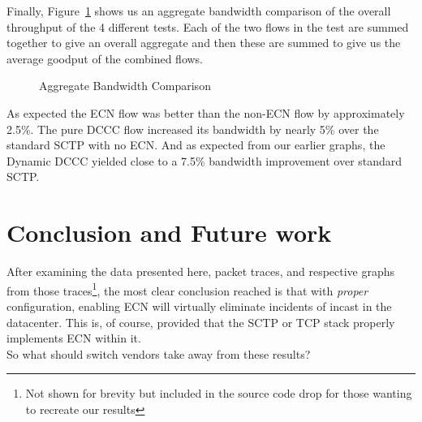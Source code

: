 \documentclass[12pt]{article}
\begin{document}
Finally, Figure~\ref{fig:aggBw}  shows us an aggregate bandwidth comparison of the 
overall throughput of the 4 different tests. Each of the two flows in the test are summed
together to give an overall aggregate and then these are summed to give us the average
goodput of the combined flows.

\begin{figure}[h]
\centering
{}
\caption{Aggregate Bandwidth Comparison}
\label{fig:aggBw}
\end{figure}

As expected the ECN flow was better than the non-ECN flow by approximately 2.5\%. The
pure DCCC flow increased its bandwidth by nearly 5\% over the standard SCTP with no ECN.
And as expected from our earlier graphs, the Dynamic DCCC yielded close to a 7.5\% bandwidth
improvement over standard SCTP.

\section{Conclusion and Future work}

After examining the data presented here, packet traces, and respective
graphs from those traces\footnote{Not shown for brevity but included in the source
code drop for those wanting to recreate our results}, the most clear conclusion reached is that 
with \emph{proper} configuration, enabling ECN will virtually eliminate incidents of
incast in the datacenter. This is, of course, provided that the SCTP or
TCP stack properly implements ECN within it. 
\\

So what should switch vendors take away from these results?
\end{document}
